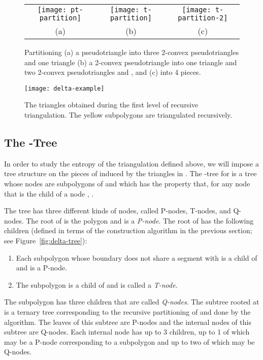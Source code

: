 \documentclass[lotsofwhite]{patmorin}
\newcommand{\figlabel}[1]{\label{fig:#1}}
\newcommand{\figref}[1]{\mbox{Figure~\ref{fig:#1}}}
\begin{document}
\begin{figure}
  \begin{center}
    \begin{tabular}{ccc}
      \texttt{[image: pt-partition]} & 
      \texttt{[image: t-partition]} &
      \texttt{[image: t-partition-2]} \\
      (a) & (b) & (c)
    \end{tabular}
  \end{center}
  \caption{Partitioning (a) a pseudotriangle  into three 2-convex
pseudotriangles  and one triangle  (b) a 2-convex
pseudotriangle  into one triangle  and two 2-convex
pseudotriangles  and , and (c)  into 4 pieces.}
  \figlabel{pt-partition}
\end{figure}

\begin{figure}
  \begin{center}
      \texttt{[image: delta-example]}
  \end{center}
  \caption{The triangles obtained during the first level of recursive
triangulation.  The yellow subpolygons are triangulated recursively.}
  \figlabel{delta-example}
\end{figure}

\subsection{The -Tree }

In order to study the entropy of the triangulation  defined
above, we will impose a tree structure on the pieces of  induced by
the triangles in .  The -tree  for  is a
tree whose nodes are subpolygons of  and which has the property
that, for any node  that is the child of a node , .

The tree  has three different kinds of nodes, called P-nodes,
T-nodes, and Q-nodes.  The root  of  is the polygon  and is
a \emph{P-node}.  The root of  has the following children
(defined in terms of the construction algorithm in the previous
section; see \figref{delta-tree}):

\begin{enumerate}
\item Each subpolygon  whose boundary does not share a segment
      with  is a child of  and is a P-node.  
\item The subpolygon  is a child of  and is
called a \emph{T-node}.
\end{enumerate}

The subpolygon  has three children  that are called
\emph{Q-nodes}.  The subtree rooted at  is a ternary tree
corresponding to the recursive partitioning of  and  done by
the algorithm. The leaves of this subtree are P-nodes and the internal
nodes of this subtree are Q-nodes.  Each internal node has up to 3
children, up to 1 of which may be a P-node corresponding to a
subpolygon  and up to two of which may be Q-nodes.
\end{document}
